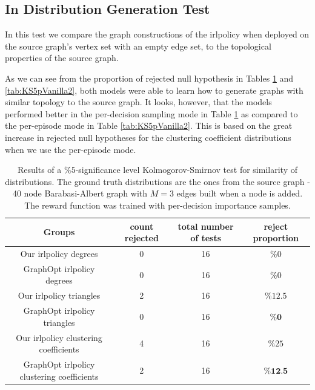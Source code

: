 \documentclass{report}
\numberwithin{equation}{section}
\numberwithin{figure}{section}
\numberwithin{table}{section}
\numberwithin{algorithm}{section}
\begin{document}
\subsection{In Distribution Generation Test}
In this test we compare the graph constructions of the irlpolicy 
when deployed on the source graph's vertex set with an empty 
edge set, to the topological properties of the source graph.

As we can see from the proportion of rejected null hypothesis in 
Tables \ref{tab:KS5pPerDec2} and \ref{tab:KS5pVanilla2}, 
both models were able to learn how to generate graphs with similar 
topology to the source graph. It looks, however, that the models 
performed better in the per-decision sampling mode in Table 
\ref{tab:KS5pPerDec2} as compared to the per-episode mode in 
Table \ref{tab:KS5pVanilla2}. This is based on the 
great increase in rejected null hypotheses for the clustering 
coefficient distributions when we use the per-episode mode.

\begin{table}[!h]
  \begin{center}
    \caption{\label{tab:KS5pPerDec2} 
    Results of a $\%5$-significance level 
    Kolmogorov-Smirnov 
    test for similarity of distributions. 
    The ground truth distributions are the ones 
    from the source graph - 40 node Barabasi-Albert graph 
    with $M=3$ edges built when a node is added. The reward 
    function was trained with per-decision importance samples.}
    \begin{tabular}{|c|c|c|c|}
      \hline
      \textbf{Groups} & \textbf{count rejected} & \textbf{total number of tests} & \textbf{reject proportion}\\
      \hline
      Our irlpolicy degrees & 0 & 16 & $\%0$\\
      GraphOpt irlpolicy degrees & 0 & 16 & $\%0$\\
      \hline
      Our irlpolicy triangles & 2 & 16 & $\%12.5$\\
      GraphOpt irlpolicy triangles & 0 & 16 & $\%\textbf{0}$\\
      \hline
      Our irlpolicy clustering coefficients & 4 & 16 & $\%25$\\
      GraphOpt irlpolicy clustering coefficients & 2 & 16 & $\%\textbf{12.5}$\\
      \hline
    \end{tabular}
  \end{center}
\end{table}
\end{document}
